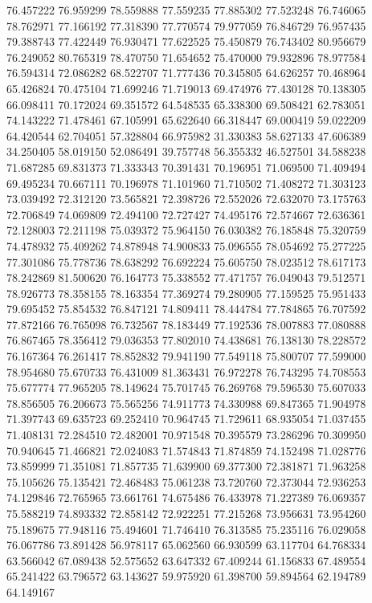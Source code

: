 76.457222
76.959299
78.559888
77.559235
77.885302
77.523248
76.746065
78.762971
77.166192
77.318390
77.770574
79.977059
76.846729
76.957435
79.388743
77.422449
76.930471
77.622525
75.450879
76.743402
80.956679
76.249052
80.765319
78.470750
71.654652
75.470000
79.932896
78.977584
76.594314
72.086282
68.522707
71.777436
70.345805
64.626257
70.468964
65.426824
70.475104
71.699246
71.719013
69.474976
77.430128
70.138305
66.098411
70.172024
69.351572
64.548535
65.338300
69.508421
62.783051
74.143222
71.478461
67.105991
65.622640
66.318447
69.000419
59.022209
64.420544
62.704051
57.328804
66.975982
31.330383
58.627133
47.606389
34.250405
58.019150
52.086491
39.757748
56.355332
46.527501
34.588238
71.687285
69.831373
71.333343
70.391431
70.196951
71.069500
71.409494
69.495234
70.667111
70.196978
71.101960
71.710502
71.408272
71.303123
73.039492
72.312120
73.565821
72.398726
72.552026
72.632070
73.175763
72.706849
74.069809
72.494100
72.727427
74.495176
72.574667
72.636361
72.128003
72.211198
75.039372
75.964150
76.030382
76.185848
75.320759
74.478932
75.409262
74.878948
74.900833
75.096555
78.054692
75.277225
77.301086
75.778736
78.638292
76.692224
75.605750
78.023512
78.617173
78.242869
81.500620
76.164773
75.338552
77.471757
76.049043
79.512571
78.926773
78.358155
78.163354
77.369274
79.280905
77.159525
75.951433
79.695452
75.854532
76.847121
74.809411
78.444784
77.784865
76.707592
77.872166
76.765098
76.732567
78.183449
77.192536
78.007883
77.080888
76.867465
78.356412
79.036353
77.802010
74.438681
76.138130
78.228572
76.167364
76.261417
78.852832
79.941190
77.549118
75.800707
77.599000
78.954680
75.670733
76.431009
81.363431
76.972278
76.743295
74.708553
75.677774
77.965205
78.149624
75.701745
76.269768
79.596530
75.607033
78.856505
76.206673
75.565256
74.911773
74.330988
69.847365
71.904978
71.397743
69.635723
69.252410
70.964745
71.729611
68.935054
71.037455
71.408131
72.284510
72.482001
70.971548
70.395579
73.286296
70.309950
70.940645
71.466821
72.024083
71.574843
71.874859
74.152498
71.028776
73.859999
71.351081
71.857735
71.639900
69.377300
72.381871
71.963258
75.105626
75.135421
72.468483
75.061238
73.720760
72.373044
72.936253
74.129846
72.765965
73.661761
74.675486
76.433978
71.227389
76.069357
75.588219
74.893332
72.858142
72.922251
77.215268
73.956631
73.954260
75.189675
77.948116
75.494601
71.746410
76.313585
75.235116
76.029058
76.067786
73.891428
56.978117
65.062560
66.930599
63.117704
64.768334
63.566042
67.089438
52.575652
63.647332
67.409244
61.156833
67.489554
65.241422
63.796572
63.143627
59.975920
61.398700
59.894564
62.194789
64.149167
